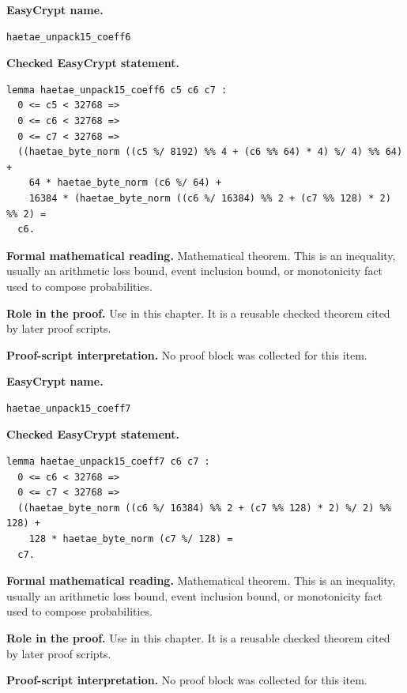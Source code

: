 \begin{formaltheorem}
\noindent\textbf{EasyCrypt name.}
\begin{lstlisting}[language=EasyCrypt,basicstyle=\ttfamily\scriptsize]
haetae_unpack15_coeff6
\end{lstlisting}
\noindent\textbf{Checked EasyCrypt statement.}
\begin{lstlisting}[language=EasyCrypt,basicstyle=\ttfamily\scriptsize]
lemma haetae_unpack15_coeff6 c5 c6 c7 :
  0 <= c5 < 32768 =>
  0 <= c6 < 32768 =>
  0 <= c7 < 32768 =>
  ((haetae_byte_norm ((c5 %/ 8192) %% 4 + (c6 %% 64) * 4) %/ 4) %% 64) +
    64 * haetae_byte_norm (c6 %/ 64) +
    16384 * (haetae_byte_norm ((c6 %/ 16384) %% 2 + (c7 %% 128) * 2) %% 2) =
  c6.
\end{lstlisting}
\noindent\textbf{Formal mathematical reading.}
Mathematical theorem. This is an inequality, usually an arithmetic loss bound, event inclusion bound, or monotonicity fact used to compose probabilities.

\noindent\textbf{Role in the proof.}
Use in this chapter. It is a reusable checked theorem cited by later proof scripts.

\noindent\textbf{Proof-script interpretation.}
No proof block was collected for this item.

\end{formaltheorem}

\begin{formaltheorem}
\noindent\textbf{EasyCrypt name.}
\begin{lstlisting}[language=EasyCrypt,basicstyle=\ttfamily\scriptsize]
haetae_unpack15_coeff7
\end{lstlisting}
\noindent\textbf{Checked EasyCrypt statement.}
\begin{lstlisting}[language=EasyCrypt,basicstyle=\ttfamily\scriptsize]
lemma haetae_unpack15_coeff7 c6 c7 :
  0 <= c6 < 32768 =>
  0 <= c7 < 32768 =>
  ((haetae_byte_norm ((c6 %/ 16384) %% 2 + (c7 %% 128) * 2) %/ 2) %% 128) +
    128 * haetae_byte_norm (c7 %/ 128) =
  c7.
\end{lstlisting}
\noindent\textbf{Formal mathematical reading.}
Mathematical theorem. This is an inequality, usually an arithmetic loss bound, event inclusion bound, or monotonicity fact used to compose probabilities.

\noindent\textbf{Role in the proof.}
Use in this chapter. It is a reusable checked theorem cited by later proof scripts.

\noindent\textbf{Proof-script interpretation.}
No proof block was collected for this item.

\end{formaltheorem}


